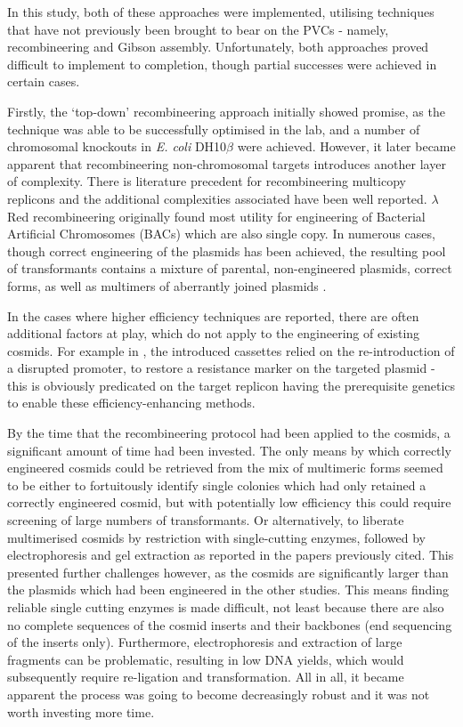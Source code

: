 In this study, both of these approaches were implemented, utilising techniques that have not previously been brought to bear on the PVCs - namely, recombineering and Gibson assembly. Unfortunately, both approaches proved difficult to implement to completion, though partial successes were achieved in certain cases.

Firstly, the `top-down' recombineering approach initially showed promise, as the technique was able to be successfully optimised in the lab, and a number of chromosomal knockouts in \emph{E. coli} DH10$\beta$ were achieved. However, it later became apparent that recombineering non-chromosomal targets introduces another layer of complexity. There is literature precedent for recombineering multicopy replicons and the additional complexities associated have been well reported. $\lambda$Red recombineering originally found most utility for engineering of Bacterial Artificial Chromosomes (BACs) which are also single copy. In numerous cases, though correct engineering of the plasmids has been achieved, the resulting pool of transformants contains a mixture of parental, non-engineered plasmids, correct forms, as well as multimers of aberrantly joined plasmids \citep{Thomason2007, Lee2001, Yosef2004, Vetcher2005}.

In the cases where higher efficiency techniques are reported, there are often additional factors at play, which do not apply to the engineering of existing cosmids. For example in \cite{Yosef2004}, the introduced cassettes relied on the re-introduction of a disrupted promoter, to restore a resistance marker on the targeted plasmid - this is obviously predicated on the target replicon having the prerequisite genetics to enable these efficiency-enhancing methods.

By the time that the recombineering protocol had been applied to the cosmids, a significant amount of time had been invested. The only means by which correctly engineered cosmids could be retrieved from the mix of multimeric forms seemed to be either to fortuitously identify single colonies which had only retained a correctly engineered cosmid, but with potentially low efficiency this could require screening of large numbers of transformants. Or alternatively, to liberate multimerised cosmids by restriction with single-cutting enzymes, followed by electrophoresis and gel extraction as reported in the papers previously cited. This presented further challenges however, as the cosmids are significantly larger than the plasmids which had been engineered in the other studies. This means finding reliable single cutting enzymes is made difficult, not least because there are also no complete sequences of the cosmid inserts and their backbones (end sequencing of the inserts only). Furthermore, electrophoresis and extraction of large fragments can be problematic, resulting in low DNA yields, which would subsequently require re-ligation and transformation. All in all, it became apparent the process was going to become decreasingly robust and it was not worth investing more time.

